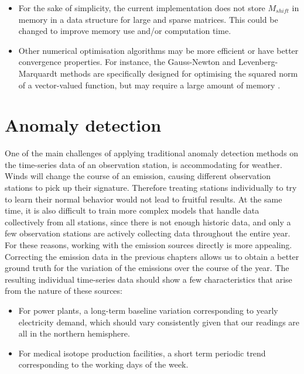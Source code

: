 \documentclass{article}
\begin{document}
\begin{itemize}
    \item For the sake of simplicity, the current implementation does not store $M_{shift}$ in memory in a data structure for large and sparse matrices. This could be changed to improve memory use and/or computation time.
    
    \item Other numerical optimisation algorithms may be more efficient or have better convergence properties. For instance, the Gauss-Newton and Levenberg-Marquardt methods are specifically designed for optimising the squared norm of a vector-valued function, but may require a large amount of memory \cite[Section 10.3]{Nocedal2006}.
    
\end{itemize}
    
\section{Anomaly detection}


One of the main challenges of applying traditional anomaly detection methods on the time-series data of an observation station, is accommodating for weather. Winds will change the course of an emission, causing different observation stations to pick up their signature. Therefore treating stations individually to try to learn their normal behavior would not lead to fruitful results. At the same time, it is also difficult to train more complex models that handle data collectively from all stations, since there is not enough historic data, and only a few observation stations are actively collecting data throughout the entire year.\\

For these reasons, working with the emission sources directly is more appealing. Correcting the emission data in the previous chapters allows us to obtain a better ground truth for the variation of the emissions over the course of the year. The resulting individual time-series data should show a few characteristics that arise from the nature of these sources:
\begin{itemize}
    \item For power plants, a long-term baseline variation corresponding to yearly electricity demand, which should vary consistently given that our readings are all in the northern hemisphere.
    \item For medical isotope production facilities, a short term periodic trend corresponding to the working days of the week.  
\end{itemize}  
\end{document}
